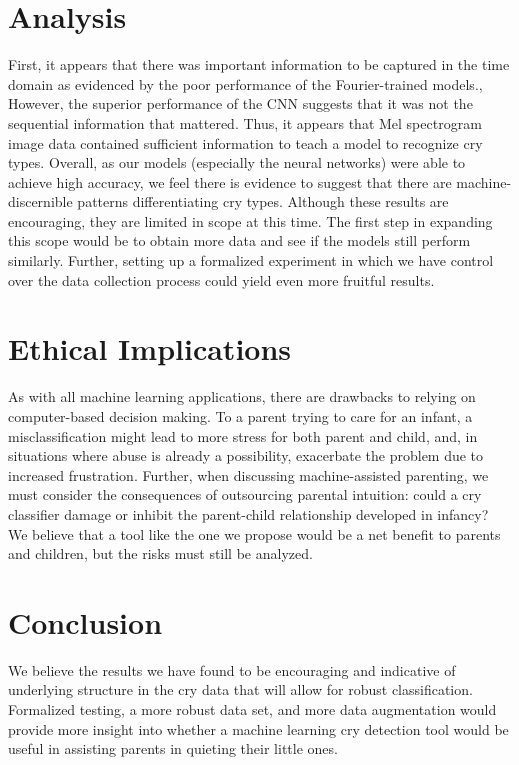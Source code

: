 \documentclass[11pt]{article}
\begin{document}
\section{Analysis}
First, it appears that there was important information to be captured in the time domain as evidenced by the poor performance of the Fourier-trained models., However, the superior performance of the CNN suggests that it was not the sequential information that mattered.
Thus, it appears that Mel spectrogram image data contained sufficient information to teach a model to recognize cry types.
Overall, as our models (especially the neural networks) were able to achieve high accuracy, we feel there is evidence to suggest that there are machine-discernible patterns differentiating cry types.
Although these results are encouraging, they are limited in scope at this time.
The first step in expanding this scope would be to obtain more data and see if the models still perform similarly.
Further, setting up a formalized experiment in which we have control over the data collection process could yield even more fruitful results.

\section{Ethical Implications}
As with all machine learning applications, there are drawbacks to relying on computer-based decision making.
To a parent trying to care for an infant, a misclassification might lead to more stress for both parent and child, and, in situations where abuse is already a possibility, exacerbate the problem due to increased frustration.
Further, when discussing machine-assisted parenting, we must consider the consequences of outsourcing parental intuition: could a cry classifier damage or inhibit the parent-child relationship developed in infancy?
We believe that a tool like the one we propose would be a net benefit to parents and children, but the risks must still be analyzed.

\section{Conclusion}
We believe the results we have found to be encouraging and indicative of underlying structure in the cry data that will allow for robust classification.
Formalized testing, a more robust data set, and more data augmentation would provide more insight into whether a machine learning cry detection tool would be useful in assisting parents in quieting their little ones.

\pagebreak
\printbibliography
\end{document}
